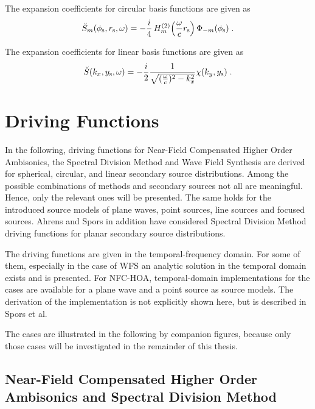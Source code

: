 The expansion coefficients for circular basis functions are given as
%
\begin{equation}
    \breve{S}_m(\phi_\text{s},r_\text{s},\omega) = -\frac{i}{4}
    \H{m}{2} \left(\omegac r_\text{s}\right)
    \Phi_{-m}(\phi_\text{s}) \qp
    \label{eq:line_source_circular}
\end{equation}
%

The expansion coefficients for linear basis functions are given as
%
\begin{equation}
    \breve{S}(k_x,y_\text{s},\omega) = -\frac{i}{2} \frac{1}{\sqrt{(\omegac)^2-k_x^2}}
    \chi(k_y,y_\text{s})\qp
    \label{eq:line_source_linear}
\end{equation}
%

\section{Driving Functions}
\label{sec:driving_functions}

In the following, driving functions for Near-Field Compensated High\-er Order
Ambisonics, the Spectral Division Method and Wave Field Synthesis are derived
for spherical, circular, and linear secondary source distributions. Among the
possible combinations of methods and secondary sources not all are
meaningful. Hence, only the relevant ones will be presented. The same holds for the
introduced source models of plane waves, point sources, line sources and focused
sources.
Ahrens and
Spors
in addition have considered Spectral Division Method driving functions for
planar secondary source distributions.

The driving functions are given in the temporal-frequency domain. For some of them,
especially in the case of \ac{WFS} an analytic solution in the temporal
domain exists and is presented. For \ac{NFC-HOA}, temporal-domain implementations
for the \twohalfD cases are available for a plane wave and a point source as source models. The
derivation of the implementation is not explicitly shown here, but is described
in Spors et al.

The \twohalfD cases are illustrated in the following by companion
figures, because only those cases will be investigated in the remainder of this
thesis.

\subsection{Near-Field Compensated Higher Order Ambisonics and Spectral Division Method}
\label{sec:driving_functions_hoa}


